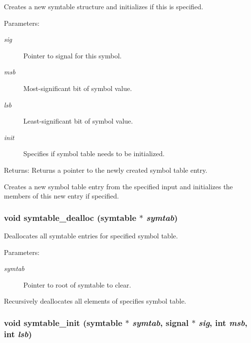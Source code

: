 Creates a new symtable structure and initializes if this is specified. 

\begin{Desc}
\item[Parameters:]
\begin{description}
\item[{\em sig}]Pointer to signal for this symbol. \item[{\em msb}]Most-significant bit of symbol value. \item[{\em lsb}]Least-significant bit of symbol value. \item[{\em init}]Specifies if symbol table needs to be initialized.\end{description}
\end{Desc}
\begin{Desc}
\item[Returns:]Returns a pointer to the newly created symbol table entry.\end{Desc}
Creates a new symbol table entry from the specified input and initializes the members of this new entry if specified. 
\subsubsection{\setlength{\rightskip}{0pt plus 5cm}void symtable\_\-dealloc ({\bf symtable} $\ast$ {\em symtab})}\label{symtable_8c_a10}


Deallocates all symtable entries for specified symbol table. 

\begin{Desc}
\item[Parameters:]
\begin{description}
\item[{\em symtab}]Pointer to root of symtable to clear.\end{description}
\end{Desc}
Recursively deallocates all elements of specifies symbol table. 
\subsubsection{\setlength{\rightskip}{0pt plus 5cm}void symtable\_\-init ({\bf symtable} $\ast$ {\em symtab}, {\bf signal} $\ast$ {\em sig}, int {\em msb}, int {\em lsb})}\label{symtable_8c_a5}


